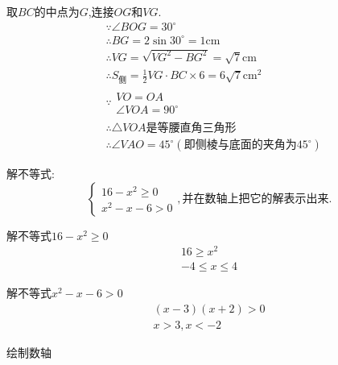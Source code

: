 \begin{questions}
\begin{solution}
		取$BC$的中点为$G$,连接$OG$和$VG$.
		\begin{align*}
			 & \because \angle{BOG} = 30^\circ                                             \\
			 & \therefore BG = 2\sin30^\circ = 1 \text{cm}                                 \\
			 & \therefore VG = \sqrt{VG^2 - BG^2} = \sqrt{7}\text{cm}                      \\
			 & \therefore S_{\text{侧}} = \frac12VG\cdot BC \times 6 = 6\sqrt{7}\text{cm}^2 \\
			 & \because
			\begin{array}{l}
				VO = OA \\
				\angle{VOA} = 90^\circ
			\end{array}                                                          \\
			 & \therefore \triangle{VOA}\text{是等腰直角三角形}                                    \\
			 & \therefore \angle{VAO} = 45^\circ (\text{即侧棱与底面的夹角为}45^\circ)
		\end{align*}
	\end{solution}

	\question[10] 解不等式:
	\begin{equation*}
		\begin{cases}
			16 - x^2 \geqslant 0 \\
			x^2 - x - 6 > 0
		\end{cases},并在数轴上把它的解表示出来.
	\end{equation*}
	\begin{solution}
		\begin{cenum}
			\item 解不等式$16 - x^2 \geqslant 0$
			      \begin{align*}
				      16  \geqslant x^2 \\
				      -4 \leqslant x \leqslant 4
			      \end{align*}
			\item 解不等式$x^2 - x - 6 > 0$
			      \begin{align*}
				      (x-3)(x+2) > 0 \\
				      x > 3, x < -2
			      \end{align*}
			\item 绘制数轴

			      \begin{center}
\end{center}
\end{cenum}
\end{solution}
\end{questions}
